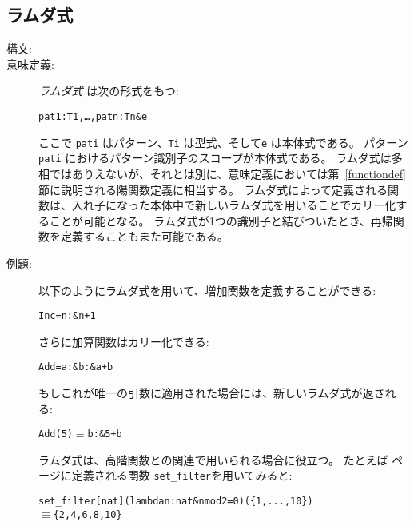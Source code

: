 \documentclass[\pformat,12pt]{jarticle}
\newcommand{\MYEQUIV}{$\equiv$}
\begin{document}
\subsection{ラムダ式}\label{lambda}

\begin{description}
\item[構文:]



        
\item[意味定義:] {\it ラムダ式} は次の形式をもつ:
  \begin{alltt}
     pat1 : T1, \ldots, patn : Tn \& e
  \end{alltt}
 ここで {\tt pati} はパターン、{\tt Ti} は型式、そして{\tt e} は本体式である。 
パターン{\tt pati} におけるパターン識別子のスコープが本体式である。
ラムダ式は多相ではありえないが、それとは別に、意味定義においては第~\ref{functiondef}節に説明される陽関数定義に相当する。
ラムダ式によって定義される関数は、入れ子になった本体中で新しいラムダ式を用いることでカリー化することが可能となる。
ラムダ式が1つの識別子と結びついたとき、再帰関数を定義することもまた可能である。
\item[例題:] 以下のようにラムダ式を用いて、増加関数を定義することができる:
  \begin{alltt}
    Inc =  n :  \& n + 1
  \end{alltt}
さらに加算関数はカリー化できる:
  \begin{alltt}
    Add =  a :  \&  b :  \& a + b
  \end{alltt}
もしこれが唯一の引数に適用された場合には、新しいラムダ式が返される:
  \begin{alltt}
    Add(5) \(\equiv\)  b :  \& 5 + b
  \end{alltt}
 ラムダ式は、高階関数との関連で用いられる場合に役立つ。
 たとえば \pageref{setfilterdef}ページに定義される関数 \texttt{set\_filter}を用いてみると:
  \begin{alltt}
  set_filter[nat](lambda n:nat & n mod 2 = 0)(\{1,...,10\})
  \MYEQUIV \{2,4,6,8,10\}
  \end{alltt}
\end{description}
\end{document}
